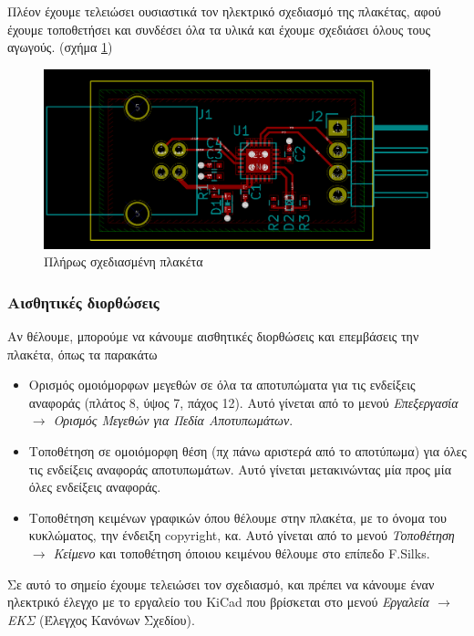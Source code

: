 \documentclass[a4paper]{article}
\begin{document}
Πλέον έχουμε τελειώσει ουσιαστικά τον ηλεκτρικό σχεδιασμό της πλακέτας, αφού έχουμε τοποθετήσει και συνδέσει όλα τα υλικά και έχουμε σχεδιάσει όλους τους αγωγούς. (σχήμα \ref{fig:pcb-circ-final})

\begin{figure}
  \begin{center}
    \includegraphics[width=.9\textwidth]{img/pcb-circ-final.png}
    \caption{Πλήρως σχεδιασμένη πλακέτα}
    \label{fig:pcb-circ-final}
  \end{center}
\end{figure}


\subsubsection{Αισθητικές διορθώσεις}

Αν θέλουμε, μπορούμε να κάνουμε αισθητικές διορθώσεις και επεμβάσεις την πλακέτα, όπως τα παρακάτω
\begin{itemize}
    \item Ορισμός ομοιόμορφων μεγεθών σε όλα τα αποτυπώματα για τις ενδείξεις αναφοράς (πλάτος 8, ύψος 7, πάχος 12). Αυτό γίνεται από το μενού \textit{Επεξεργασία $\rightarrow$ Ορισμός Μεγεθών για Πεδία Αποτυπωμάτων}.
    \item Τοποθέτηση σε ομοιόμορφη θέση (πχ πάνω αριστερά από το αποτύπωμα) για όλες τις ενδείξεις αναφοράς αποτυπωμάτων. Αυτό γίνεται μετακινώντας μία προς μία όλες ενδείξεις αναφοράς.
    \item Τοποθέτηση κειμένων γραφικών όπου θέλουμε στην πλακέτα, με το όνομα του κυκλώματος, την ένδειξη copyright, κα. Αυτό γίνεται από το μενού \textit{Τοποθέτηση $\rightarrow$ Κείμενο} και τοποθέτηση όποιου κειμένου θέλουμε στο επίπεδο F.Silks.
\end{itemize}

Σε αυτό το σημείο έχουμε τελειώσει τον σχεδιασμό, και πρέπει να κάνουμε έναν ηλεκτρικό έλεγχο με το εργαλείο του \textenglish{KiCad} που βρίσκεται στο μενού \textit{Εργαλεία $\rightarrow$ ΕΚΣ} (Έλεγχος Κανόνων Σχεδίου).
\end{document}
